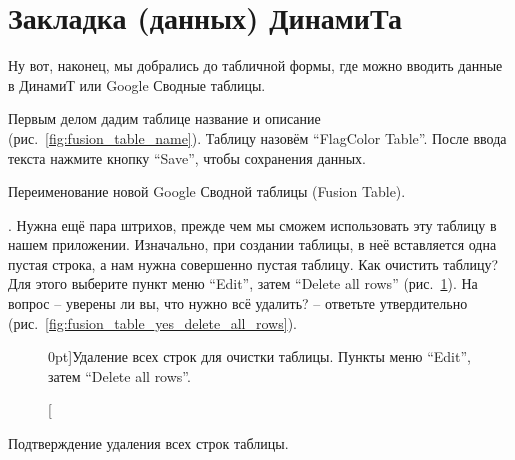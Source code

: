 \section{Закладка (данных) ДинамиТа}

Ну вот, наконец, мы добрались до табличной формы, 
где можно вводить данные в ДинамиТ или Google Сводные таблицы.

Первым делом дадим таблице название и описание (рис.~\ref{fig:fusion_table_name}). 
Таблицу назовём ``FlagColor Table''. После ввода текста нажмите кнопку ``Save'', 
чтобы сохранения данных.

\begin{marginfigure}[0.0cm]
{
\setlength{\fboxsep}{0pt}%
\setlength{\fboxrule}{1pt}%
}
    \caption{Переименование новой Google Сводной таблицы (Fusion Table).}
  \label{fig:fusion_table_name}
\end{marginfigure}


. Нужна ещё пара штрихов, прежде чем мы сможем использовать эту таблицу в нашем приложении. 
Изначально, при создании таблицы, в неё вставляется одна пустая строка, а нам нужна совершенно пустая таблицу. Как очистить таблицу? 
Для этого выберите пункт меню ``Edit'', затем ``Delete all rows'' (рис.~\ref{fig:fusion_table_delete_all_rows}). 
На вопрос -- уверены ли вы, что нужно всё удалить? -- ответьте утвердительно (рис.~\ref{fig:fusion_table_yes_delete_all_rows}).

\begin{figure}
{
\setlength{\fboxsep}{0pt}%
\setlength{\fboxrule}{1pt}%
}
    \caption[Очистка Сводной таблицы.][0pt]{Удаление всех строк для очистки таблицы.
            {
                Пункты меню ``Edit'', затем ``Delete all rows''.
            }
    }
  \label{fig:fusion_table_delete_all_rows}
\end{figure}


\begin{marginfigure}[0.0cm]
{%
\setlength{\fboxsep}{0pt}%
\setlength{\fboxrule}{1pt}%
%
}%
    \caption{Подтверждение удаления всех строк таблицы.}
\label{fig:fusion_table_yes_delete_all_rows}
\end{marginfigure}



